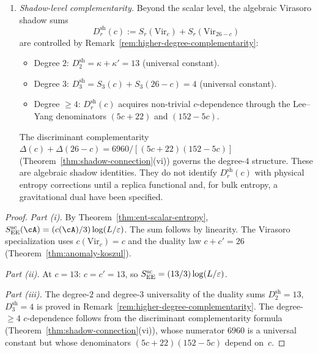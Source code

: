 \begin{theorem}
\begin{enumerate}[label=\textup{(\roman*)}]
\item \emph{Shadow-level complementarity.}
Beyond the scalar level, the algebraic Virasoro shadow sums
\[
D_r^{\mathrm{sh}}(c)
:= S_r(\mathrm{Vir}_c)+S_r(\mathrm{Vir}_{26-c})
\]
are controlled by
Remark~\textup{\ref{rem:higher-degree-complementarity}}:
\begin{itemize}
\item Degree $2$: $D_2^{\mathrm{sh}} = \kappa + \kappa' = 13$
 \textup{(}universal constant\textup{)}.
\item Degree $3$: $D_3^{\mathrm{sh}} = S_3(c) + S_3(26{-}c) = 4$
 \textup{(}universal constant\textup{)}.
\item Degree $\ge 4$: $D_r^{\mathrm{sh}}(c)$ acquires non-trivial
 $c$-dependence through the Lee--Yang denominators
 $(5c{+}22)$ and $(152{-}5c)$.
\end{itemize}
The discriminant complementarity
$\Delta(c) + \Delta(26-c) =
6960/[(5c{+}22)(152{-}5c)]$
\textup{(}Theorem~\textup{\ref{thm:shadow-connection}(vi)}\textup{)}
governs the degree-$4$ structure.
These are algebraic shadow identities.  They do not identify
$D_r^{\mathrm{sh}}(c)$ with physical entropy corrections until a
replica functional and, for bulk entropy, a gravitational dual have
been specified.
\end{enumerate}
\end{theorem}

\begin{proof}
\emph{Part (i).}
By Theorem~\ref{thm:ent-scalar-entropy},
$S_{\EE}^{\mathrm{sc}}(\cA)
= (c(\cA)/3)\log(L/\varepsilon)$.
The sum follows by linearity.
The Virasoro specialization uses
$c(\mathrm{Vir}_c) = c$ and
the duality law $c + c' = 26$
(Theorem~\ref{thm:anomaly-koszul}).

\emph{Part (ii).}
At $c = 13$: $c = c' = 13$, so
$S_{\mathrm{EE}}^{\mathrm{sc}}
= (13/3)\log(L/\varepsilon)$.

\emph{Part (iii).}
The degree-$2$ and degree-$3$ universality of the duality sums
$D_2^{\mathrm{sh}} = 13$, $D_3^{\mathrm{sh}} = 4$ is proved in
Remark~\ref{rem:higher-degree-complementarity}.
The degree-$\ge 4$ $c$-dependence follows from the
discriminant complementarity formula
(Theorem~\ref{thm:shadow-connection}(vi)), whose
numerator $6960$ is a universal constant but whose
denominators $(5c{+}22)(152{-}5c)$ depend on~$c$.
\end{proof}

